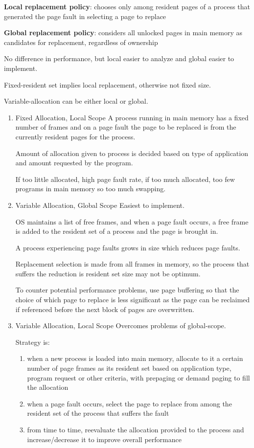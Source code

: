 \documentclass[11pt]{article}
\begin{document}
\textbf{Local replacement policy}: chooses only among resident pages of a process that
generated the page fault in selecting a page to replace

\textbf{Global replacement policy}: considers all unlocked pages in main memory as
candidates for replacement, regardless of ownership

No difference in performance, but local easier to analyze and global easier to
implement.

Fixed-resident set implies local replacement, otherwise not fixed size.

Variable-allocation can be either local or global.
\begin{enumerate}
\item Fixed Allocation, Local Scope
\label{sec:orgfd2c84a}
A process running in main memory has a fixed number of frames and on a page
fault the page to be replaced is from the currently resident pages for the
process.

Amount of allocation given to process is decided based on type of application
and amount requested by the program.

If too little allocated, high page fault rate, if too much allocated, too few
programs in main memory so too much swapping.
\item Variable Allocation, Global Scope
\label{sec:org5733526}
Easiest to implement.

OS maintains a list of free frames, and when a page fault occurs, a free frame is
added to the resident set of a process and the page is brought in.

A process experiencing page faults grows in size which reduces page faults.

Replacement selection is made from all frames in memory, so the process that
suffers the reduction is resident set size may not be optimum.

To counter potential performance problems, use page buffering so that the choice
of which page to replace is less significant as the page can be reclaimed if
referenced before the next block of pages are overwritten.
\item Variable Allocation, Local Scope
\label{sec:org19b926a}
Overcomes problems of global-scope.

Strategy is:
\begin{enumerate}
\item when a new process is loaded into main memory, allocate to it a certain
number of page frames as its resident set based on application type, program
request or other criteria, with prepaging or demand paging to fill the
allocation
\item when a page fault occurs, select the page to replace from among the resident
set of the process that suffers the fault
\item from time to time, reevaluate the allocation provided to the process and
increase/decrease it to improve overall performance
\end{enumerate}


\end{enumerate}
\end{document}
